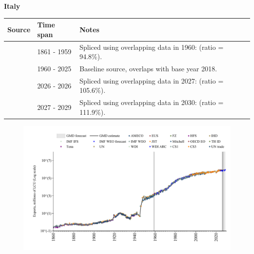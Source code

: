 \documentclass[12pt,a4paper,landscape]{article}
\begin{document}
\begin{adjustbox}{max totalsize={\paperwidth}{\paperheight},center}
\begin{minipage}[t][\textheight][t]{\textwidth}
\vspace*{0.5cm}
{}
\begin{center}
{\Large\bfseries Italy}
\end{center}
\vspace{0.5cm}
\begin{table}[H]
\centering
\small
\begin{tabular}{|l|l|l|}
\hline
\textbf{Source} & \textbf{Time span} & \textbf{Notes} \\
\hline
\rowcolor{white}\cite{CS1_ITA}& 1861 - 1959 &Spliced using overlapping data in 1960: (ratio = 94.8\%).\\
\rowcolor{lightgray}\cite{OECD_EO}& 1960 - 2025 &Baseline source, overlaps with base year 2018.\\
\rowcolor{white}\cite{AMECO}& 2026 - 2026 &Spliced using overlapping data in 2027: (ratio = 105.6\%).\\
\rowcolor{lightgray}\cite{IMF_WEO_forecast}& 2027 - 2029 &Spliced using overlapping data in 2030: (ratio = 111.9\%).\\
\hline
\end{tabular}
\end{table}
\begin{figure}[H]
\centering
\includegraphics[width=\textwidth,height=0.6\textheight,keepaspectratio]{graphs/ITA_exports.pdf}
\end{figure}
\end{minipage}
\end{adjustbox}
\end{document}
